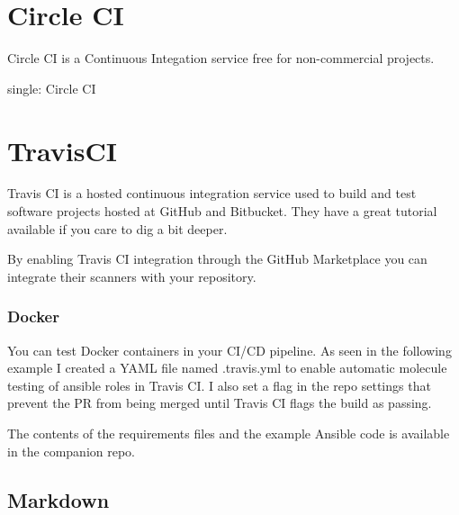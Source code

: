 \justify
%	

\section{Circle CI}

Circle CI is a Continuous Integation service free for non-commercial
projects.

single: Circle CI

\justify
%	 

\section{TravisCI}

\justify
Travis CI is a hosted continuous integration service used to build and
test software projects hosted at GitHub and Bitbucket. They have a great
tutorial available
if you care to dig a bit deeper.

\justify
By enabling Travis CI integration through the GitHub Marketplace you
can integrate their scanners with your repository.

\subsubsection{Docker}

\justify
You can test Docker containers in your CI/CD pipeline. As seen in the
following example I created a YAML file named .travis.yml to enable
automatic molecule testing of ansible roles in Travis CI. I also set a
flag in the repo settings that prevent the PR from being merged until
Travis CI flags the build as passing.

\justify
%	

The contents of the requirements files and the example Ansible code is
available in the companion repo.


\subsection{Markdown}

